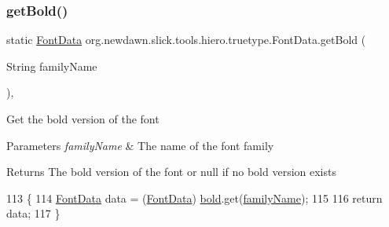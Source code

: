 \mbox{\label{classorg_1_1newdawn_1_1slick_1_1tools_1_1hiero_1_1truetype_1_1_font_data_aab80ec57f81ebdb124232bd679674c07}} 
\subsubsection{\texorpdfstring{get\+Bold()}{getBold()}}
{\footnotesize\ttfamily static \mbox{\hyperlink{classorg_1_1newdawn_1_1slick_1_1tools_1_1hiero_1_1truetype_1_1_font_data}{Font\+Data}} org.\+newdawn.\+slick.\+tools.\+hiero.\+truetype.\+Font\+Data.\+get\+Bold (\begin{DoxyParamCaption}\item[{String}]{family\+Name }\end{DoxyParamCaption})\hspace{0.3cm}{\ttfamily [inline]}, {\ttfamily [static]}}

Get the bold version of the font


\begin{DoxyParams}{Parameters}
{\em family\+Name} & The name of the font family \\
\hline
\end{DoxyParams}
\begin{DoxyReturn}{Returns}
The bold version of the font or null if no bold version exists 
\end{DoxyReturn}

\begin{DoxyCode}
113                                                       \{
114         \mbox{\hyperlink{classorg_1_1newdawn_1_1slick_1_1tools_1_1hiero_1_1truetype_1_1_font_data_a749bc5408e8c04106d580a31b5c9e597}{FontData}} data = (\mbox{\hyperlink{classorg_1_1newdawn_1_1slick_1_1tools_1_1hiero_1_1truetype_1_1_font_data_a749bc5408e8c04106d580a31b5c9e597}{FontData}}) \mbox{\hyperlink{classorg_1_1newdawn_1_1slick_1_1tools_1_1hiero_1_1truetype_1_1_font_data_a2249de026f17fb99d5f8e971df67a2ea}{bold}}.get(\mbox{\hyperlink{classorg_1_1newdawn_1_1slick_1_1tools_1_1hiero_1_1truetype_1_1_font_data_a287c606f09e3581f4eaea1b7bd81ded1}{familyName}});
115         
116         \textcolor{keywordflow}{return} data;
117     \}
\end{DoxyCode}
\mbox{\label{classorg_1_1newdawn_1_1slick_1_1tools_1_1hiero_1_1truetype_1_1_font_data_ad9eb967440de98cd62cd0f253863eeb8}} 
